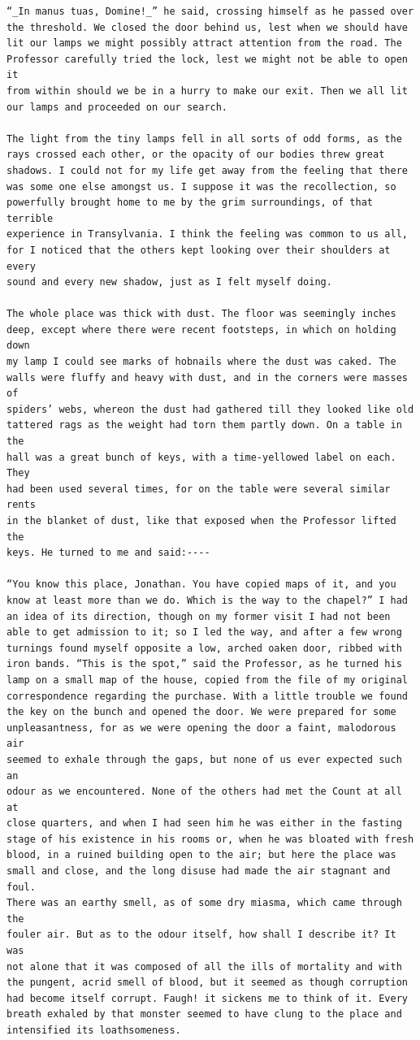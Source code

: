 \documentclass{article}
\begin{document}
\begin{verbatim}
“_In manus tuas, Domine!_” he said, crossing himself as he passed over
the threshold. We closed the door behind us, lest when we should have
lit our lamps we might possibly attract attention from the road. The
Professor carefully tried the lock, lest we might not be able to open it
from within should we be in a hurry to make our exit. Then we all lit
our lamps and proceeded on our search.

The light from the tiny lamps fell in all sorts of odd forms, as the
rays crossed each other, or the opacity of our bodies threw great
shadows. I could not for my life get away from the feeling that there
was some one else amongst us. I suppose it was the recollection, so
powerfully brought home to me by the grim surroundings, of that terrible
experience in Transylvania. I think the feeling was common to us all,
for I noticed that the others kept looking over their shoulders at every
sound and every new shadow, just as I felt myself doing.

The whole place was thick with dust. The floor was seemingly inches
deep, except where there were recent footsteps, in which on holding down
my lamp I could see marks of hobnails where the dust was caked. The
walls were fluffy and heavy with dust, and in the corners were masses of
spiders’ webs, whereon the dust had gathered till they looked like old
tattered rags as the weight had torn them partly down. On a table in the
hall was a great bunch of keys, with a time-yellowed label on each. They
had been used several times, for on the table were several similar rents
in the blanket of dust, like that exposed when the Professor lifted the
keys. He turned to me and said:----

“You know this place, Jonathan. You have copied maps of it, and you
know at least more than we do. Which is the way to the chapel?” I had
an idea of its direction, though on my former visit I had not been
able to get admission to it; so I led the way, and after a few wrong
turnings found myself opposite a low, arched oaken door, ribbed with
iron bands. “This is the spot,” said the Professor, as he turned his
lamp on a small map of the house, copied from the file of my original
correspondence regarding the purchase. With a little trouble we found
the key on the bunch and opened the door. We were prepared for some
unpleasantness, for as we were opening the door a faint, malodorous air
seemed to exhale through the gaps, but none of us ever expected such an
odour as we encountered. None of the others had met the Count at all at
close quarters, and when I had seen him he was either in the fasting
stage of his existence in his rooms or, when he was bloated with fresh
blood, in a ruined building open to the air; but here the place was
small and close, and the long disuse had made the air stagnant and foul.
There was an earthy smell, as of some dry miasma, which came through the
fouler air. But as to the odour itself, how shall I describe it? It was
not alone that it was composed of all the ills of mortality and with
the pungent, acrid smell of blood, but it seemed as though corruption
had become itself corrupt. Faugh! it sickens me to think of it. Every
breath exhaled by that monster seemed to have clung to the place and
intensified its loathsomeness.


\end{verbatim}
\end{document}
